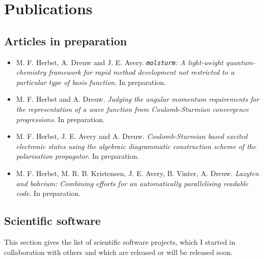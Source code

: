 \chapter*{Publications}
{}

\section*{Articles in preparation}
{}
\begin{itemize}
	\item M. F. Herbst, A. Dreuw and J. E. Avery.
		\textit{\texttt{molsturm}: A light-weight quantum-chemistry framework for rapid method development not restricted to a particular type of basis function}. In preparation.
	\item M. F. Herbst and A. Dreuw.
		\textit{Judging the angular momentum requirements for the representation of a wave function from Coulomb-Sturmian convergence progressions}. In preparation.
	\item M. F. Herbst, J. E. Avery and A. Dreuw.
		\textit{Coulomb-Sturmian based excited electronic states using the algebraic diagrammatic construction scheme of the polarisation propagator}. \linebreak In preparation.
	\item M. F. Herbst, M. R. B. Kristensen, J. E. Avery, B. Vinter, A. Dreuw.
		\textit{Lazyten and bohrium: Combining efforts for an automatically parallelising readable code}. \linebreak In preparation.
\end{itemize}


\section*{Scientific software}
{}
This section gives the list of scientific software projects,
which I started in collaboration with others
and which are released or will be released soon.

